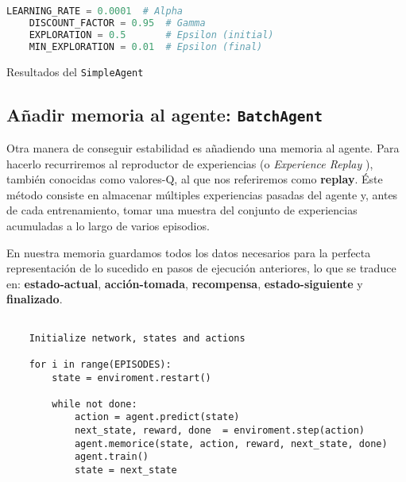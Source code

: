 \begin{minipage}{0.9\linewidth}%
    \begin{lstlisting}[frame=tb, language=Python, caption=Hiperparámetros, label=code:cartpole_drl]
    LEARNING_RATE = 0.0001  # Alpha
    DISCOUNT_FACTOR = 0.95  # Gamma
    EXPLORATION = 0.5       # Epsilon (initial)
    MIN_EXPLORATION = 0.01  # Epsilon (final)
    \end{lstlisting}%
\end{minipage}

%
       {Resultados del \texttt{SimpleAgent}}

\subsection{Añadir memoria al agente: \texttt{BatchAgent}}

Otra manera de conseguir estabilidad es añadiendo una memoria al agente. Para hacerlo recurriremos al reproductor de experiencias (o \textit{Experience Replay} \citep{Lin1992}), también conocidas como valores-Q, al que nos referiremos como \textbf{replay}. Éste método consiste en almacenar múltiples experiencias pasadas del agente y, antes de cada entrenamiento, tomar una muestra del conjunto de experiencias acumuladas a lo largo de varios episodios.

En nuestra memoria guardamos todos los datos necesarios para la perfecta representación de lo sucedido en pasos de ejecución anteriores, lo que se traduce en: \textbf{estado-actual}, \textbf{acción-tomada}, \textbf{recompensa}, \textbf{estado-siguiente} y \textbf{finalizado}.

    


\begin{minipage}{0.9\linewidth}%
    \begin{lstlisting}[frame=tb, caption=Pseudocódigo BatchAgent, inputencoding=latin1, label=code:cartpole_drl2]
    
    Initialize network, states and actions
    
    for i in range(EPISODES):
        state = enviroment.restart()

        while not done:
            action = agent.predict(state)
            next_state, reward, done  = enviroment.step(action)
            agent.memorice(state, action, reward, next_state, done)
            agent.train()
            state = next_state
        
    \end{lstlisting}%
\end{minipage}

